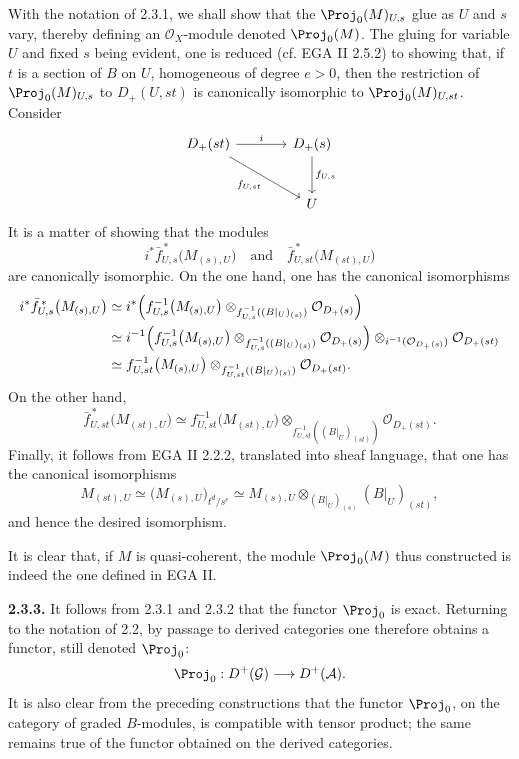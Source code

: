 With the notation of 2.3.1, we shall show that the \(\Proj_0(M)_{U,s}\) glue as \(U\) and \(s\) vary, thereby defining an \(\mathcal O_X\)-module denoted \(\Proj_0(M)\). The gluing for variable \(U\) and fixed \(s\) being evident, one is reduced (cf. EGA II 2.5.2) to showing that, if \(t\) is a section of \(B\) on \(U\), homogeneous of degree \(e>0\), then the restriction of \(\Proj_0(M)_{U,s}\) to \(D_+(U,st)\) is canonically isomorphic to \(\Proj_0(M)_{U,st}\). Consider
\[
\begin{tikzcd}[column sep=large,row sep=large]
D_+(st) \arrow[r,"i"] \arrow[dr,"f_{U,st}"'] &
D_+(s) \arrow[d,"f_{U,s}"]\\
& U
\end{tikzcd}
\]
It is a matter of showing that the modules
\[
  i^*\bar f_{U,s}^{\,*}\bigl(M_{(s),U}\bigr)
  \quad\text{and}\quad
  \bar f_{U,st}^{\,*}\bigl(M_{(st),U}\bigr)
\]
are canonically isomorphic. On the one hand, one has the canonical isomorphisms
\[
\begin{aligned}
i^*\bar f_{U,s}^{\,*}\bigl(M_{(s),U}\bigr)
&\simeq
i^*\Bigl(f_{U,s}^{-1}\bigl(M_{(s),U}\bigr)
 \otimes_{f_{U,s}^{-1}((B|_U)_{(s)})}\mathcal O_{D_+(s)}\Bigr)\\
&\simeq
i^{-1}\Bigl(f_{U,s}^{-1}\bigl(M_{(s),U}\bigr)
 \otimes_{f_{U,s}^{-1}((B|_U)_{(s)})}\mathcal O_{D_+(s)}\Bigr)
 \otimes_{i^{-1}(\mathcal O_{D_+(s)})}\mathcal O_{D_+(st)}\\
&\simeq
f_{U,st}^{-1}\bigl(M_{(s),U}\bigr)
 \otimes_{f_{U,st}^{-1}((B|_U)_{(s)})}\mathcal O_{D_+(st)} .
\end{aligned}
\]
On the other hand,
\[
  \bar f_{U,st}^{\,*}\bigl(M_{(st),U}\bigr)
  \simeq
  f_{U,st}^{-1}\bigl(M_{(st),U}\bigr)
  \otimes_{f_{U,st}^{-1}((B|_U)_{(st)})}\mathcal O_{D_+(st)} .
\]
Finally, it follows from EGA II 2.2.2, translated into sheaf language, that one has the canonical isomorphisms
\[
  M_{(st),U}\simeq
  \bigl(M_{(s),U}\bigr)_{t^d/s^e}
  \simeq
  M_{(s),U}\otimes_{(B|_U)_{(s)}}(B|_U)_{(st)},
\]
and hence the desired isomorphism.

It is clear that, if \(M\) is quasi-coherent, the module \(\Proj_0(M)\) thus constructed is indeed the one defined in EGA II.

\textbf{2.3.3.} It follows from 2.3.1 and 2.3.2 that the functor \(\Proj_0\) is exact. Returning to the notation of 2.2, by passage to derived categories one therefore obtains a functor, still denoted \(\Proj_0\):
\[
  \Proj_0:D^+(\mathcal G)\longrightarrow D^+(\mathcal A).
\]
It is also clear from the preceding constructions that the functor \(\Proj_0\), on the category of graded \(B\)-modules, is compatible with tensor product; the same remains true of the functor obtained on the derived categories.

